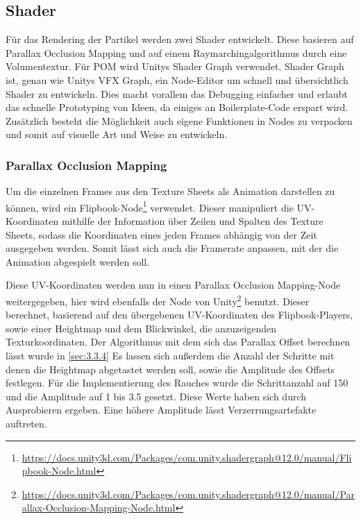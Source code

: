 

\subsection{Shader}
Für das Rendering der Partikel werden zwei Shader entwickelt. Diese basieren auf Parallax Occlusion Mapping und auf einem Raymarchingalgorithmus
durch eine Volumentextur. Für POM wird Unitys Shader Graph verwendet. Shader Graph ist, genau wie Unitys VFX Graph, ein Node-Editor um
schnell und übersichtlich Shader zu entwickeln. Dies macht vorallem das Debugging einfacher und erlaubt das schnelle Prototyping von Ideen,
da einiges an Boilerplate-Code erspart wird. Zusätzlich besteht die Möglichkeit auch eigene Funktionen in Nodes
zu verpacken und somit auf visuelle Art und Weise zu entwickeln.


\subsubsection{Parallax Occlusion Mapping}

Um die einzelnen Frames aus den Texture Sheets als Animation darstellen zu können, wird ein
Flipbook-Node\footnote{\url{https://docs.unity3d.com/Packages/com.unity.shadergraph@12.0/manual/Flipbook-Node.html}}
verwendet. Dieser manipuliert die UV-Koordinaten mithilfe der Information über Zeilen und Spalten des Texture Sheets,
sodass die Koordinaten eines jeden Frames abhängig von der Zeit ausgegeben werden.
Somit lässt sich auch die Framerate anpassen, mit der die Animation abgespielt werden soll.

Diese UV-Koordinaten werden nun in einen Parallax Occlusion Mapping-Node weitergegeben, hier wird ebenfalls der Node von
Unity\footnote{\url{https://docs.unity3d.com/Packages/com.unity.shadergraph@12.0/manual/Parallax-Occlusion-Mapping-Node.html}}
benutzt. Dieser berechnet, basierend auf den übergebenen UV-Koordinaten des Flipbook-Players, sowie einer Heightmap und dem Blickwinkel, die anzuzeigenden Texturkoordinaten.
Der Algorithmus mit dem sich das Parallax Offset berechnen lässt wurde in \autoref{sec:3.3.4}
Es lassen sich außerdem die Anzahl der Schritte mit denen die Heightmap abgetastet werden soll, sowie die Amplitude des Offsets festlegen.
Für die Implementierung des Rauches wurde die Schrittanzahl auf 150 und die Amplitude auf 1 bis 3.5 gesetzt. Diese Werte haben sich durch Ausprobieren ergeben.
Eine höhere Amplitude lässt Verzerrungsartefakte auftreten.


